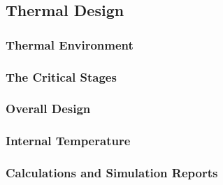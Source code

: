 \pagebreak
\subsection{Thermal Design} \label{Thermal_section}

\subsubsection{Thermal Environment}

\subsubsection{The Critical Stages}

\subsubsection{Overall Design}

\subsubsection{Internal Temperature}

\subsubsection{Calculations and Simulation Reports}
\label{sec:4.6.5}

